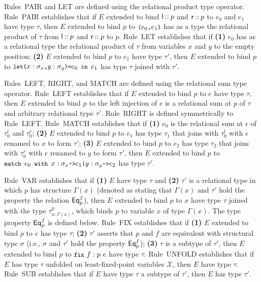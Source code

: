 Rules~PAIR and LET are defined using the relational product type
operator.
Rule~PAIR establishes that if $E$ extended to bind
$\mathsf{l} \mathbin{::} p$ and $\mathsf{r} \mathbin{::} p$ to $e_0$ and $e_1$ have
type $\tau$, then $E$ extended to bind $p$ to $\pair{ e_0 }{ e_1 }$
has as a type the relational product of $\tau$ from
$\mathsf{l} \mathbin{::} p$ and $\mathsf{r} \mathbin{::} p$ to $p$.
Rule~LET establishes that if %
\textbf{(1)} $e_0$ has as a relational type the relational product of
$\tau$ from variables $x$ and $y$ to the empty position;
%
\textbf{(2)} $E$ extended to bind $p$ to $e_1$ have type $\tau'$, then
$E$ extended to bind $p$ to
$\letexp{x}{\sigma_x}{y}{\sigma_y}{e_0}{e_1}$ has type $\tau$ joined
with $\tau'$.

Rules~LEFT, RIGHT, and MATCH are defined using the relational sum type
operator.
Rule~LEFT establishes that if $E$ extended to bind $p$ to $e$ have
type $\tau$, then $E$ extended to bind $p$ to the left injection of
$e$ is a relational sum at $p$ of $\tau$ and arbitrary relational type
$\tau'$.
%
Rule~RIGHT is defined symmetrically to Rule~LEFT.
Rule~MATCH establishes that if %
\textbf{(1)} $e_0$ is the relational sum at $\epsilon$ of $\tau_0^l$
and $\tau_0^r$;
% 
\textbf{(2)} $E$ extended to bind $p$ to $e_1$ has type $\tau_1$ that
joins with $\tau_0^l$ with $\epsilon$ renamed to $x$ to form $\tau'$;
%
\textbf{(3)} $E$ extended to bind $p$ to $e_2$ has type $\tau_2$ that
joins with $\tau_0^r$ with $\epsilon$ renamed to $y$ to form $\tau'$,
then $E$ extended to bind $p$ to
$\matchexp{e_0}{x}{\sigma_x}{e_1}{y}{\sigma_y}{e_2}$ has type
$\tau'$.

Rule~VAR establishes that if %
\textbf{(1)} $E$ have type $\tau$ and %
\textbf{(2)} $\tau'$ is a relational type in which $p$ has structure
$\Gamma(x)$ (denoted as stating that $\Gamma(x)$ and $\tau'$ hold the
property the relation $\mathsf{Eq}_{p}^{f}$), then %
$E$ extended to bind $p$ to
$x$ have type $\tau$ joined with the type $\tau_{x : \Gamma(x)}^p$,
which binds $p$ to variable $x$ of type $\Gamma(x)$.
%
The type property $\mathsf{Eq}_{p}^{f}$ is defined below.
Rule~FIX establishes that if %
\textbf{(1)} $E$ extended to bind $p$ to $e$ has type $\tau$; %
\textbf{(2)} $\tau'$ asserts that $p$ and $f$ are equivalent with
structural type $\sigma$ (i.e., $\sigma$ and $\tau'$ hold the property
$\mathsf{Eq}_{p}^{f}$); %
\textbf{(3)} $\tau$ is a subtype of $\tau'$, then %
$E$ extended to bind $p$ to $\fix{f}{p}{e}$ have type $\tau$.
Rule~UNFOLD establishes that if $E$ has type $\tau$ unfolded on
least-fixed-point variables $\mathcal{X}$, then $E$ have type $\tau$.
Rule~SUB establishes that if $E$ have type $\tau$ a subtype of $\tau'$,
then $E$ has type $\tau'$.

